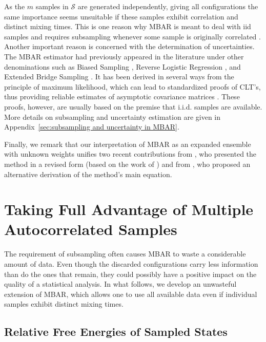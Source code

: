 \documentclass[journal=jctcce,manuscript=article,layout=twocolumn]{achemso}
\begin{document}
As the $m$ samples in $\mathcal S$ are generated independently, giving all configurations the same importance seems unsuitable if these samples exhibit correlation and distinct mixing times. This is one reason why MBAR is meant to deal with iid samples and requires subsampling whenever some sample is originally correlated \cite{Shirts_2008}. Another important reason is concerned with the determination of uncertainties. The MBAR estimator had previously appeared in the literature under other denominations such as Biased Sampling \cite{Vardi_1985, *Gill_1988}, Reverse Logistic Regression \cite{Geyer_1994}, and Extended Bridge Sampling \cite{Meng_1996, Kong_2003, Tan_2004}. It has been derived in several ways from the principle of maximum likelihood, which can lead to standardized proofs of CLT's, thus providing reliable estimates of asymptotic covariance matrices \cite{Pawitan_2001, Greene_2012}. These proofs, however, are usually based on the premise that i.i.d. samples are available. More details on subsampling and uncertainty estimation are given in Appendix~\ref{sec:subsampling and uncertainty in MBAR}.

Finally, we remark that our interpretation of MBAR as an expanded ensemble with unknown weights unifies two recent contributions from \citeauthor{Shirts_2017} \cite{Shirts_2017}, who presented the method in a revised form (based on the work of \citeauthor{Geyer_1994} \cite{Geyer_1994}) and from \citeauthor{Ding_2017} \cite{Ding_2017}, who proposed an alternative derivation of the method's main equation.

\section{Taking Full Advantage of Multiple Autocorrelated Samples}

The requirement of subsampling often causes MBAR to waste a considerable amount of data. Even though the discarded configurations carry less information than do the ones that remain, they could possibly have a positive impact on the quality of a statistical analysis. In what follows, we develop an unwasteful extension of MBAR, which allows one to use all available data even if individual samples exhibit distinct mixing times.

\subsection{Relative Free Energies of Sampled States}
\end{document}
